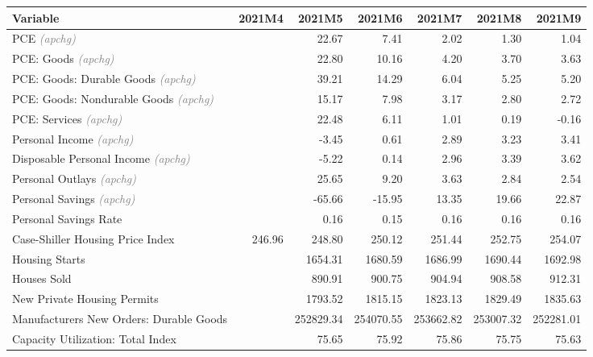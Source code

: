 \documentclass[11pt, letterpaper]{article}\usepackage[]{graphicx}\usepackage[]{color}
\begin{document}
\begin{table}[H]
\centering
\begingroup\fontsize{10pt}{12pt}\selectfont
\begin{tabular}{lrrrrrr}
  \hline
Variable & 2021M4 & 2021M5 & 2021M6 & 2021M7 & 2021M8 & 2021M9 \\ 
  \hline
PCE \textit{\footnotesize\textcolor{gray}{(apchg)}} &  & 22.67 & 7.41 & 2.02 & 1.30 & 1.04 \\ 
  PCE: Goods \textit{\footnotesize\textcolor{gray}{(apchg)}} &  & 22.80 & 10.16 & 4.20 & 3.70 & 3.63 \\ 
  PCE: Goods: Durable Goods \textit{\footnotesize\textcolor{gray}{(apchg)}} &  & 39.21 & 14.29 & 6.04 & 5.25 & 5.20 \\ 
  PCE: Goods: Nondurable Goods \textit{\footnotesize\textcolor{gray}{(apchg)}} &  & 15.17 & 7.98 & 3.17 & 2.80 & 2.72 \\ 
  PCE: Services \textit{\footnotesize\textcolor{gray}{(apchg)}} &  & 22.48 & 6.11 & 1.01 & 0.19 & -0.16 \\ 
  Personal Income \textit{\footnotesize\textcolor{gray}{(apchg)}} &  & -3.45 & 0.61 & 2.89 & 3.23 & 3.41 \\ 
  Disposable Personal Income \textit{\footnotesize\textcolor{gray}{(apchg)}} &  & -5.22 & 0.14 & 2.96 & 3.39 & 3.62 \\ 
  Personal Outlays \textit{\footnotesize\textcolor{gray}{(apchg)}} &  & 25.65 & 9.20 & 3.63 & 2.84 & 2.54 \\ 
  Personal Savings \textit{\footnotesize\textcolor{gray}{(apchg)}} &  & -65.66 & -15.95 & 13.35 & 19.66 & 22.87 \\ 
  Personal Savings Rate &  & 0.16 & 0.15 & 0.16 & 0.16 & 0.16 \\ 
  Case-Shiller Housing Price Index & 246.96 & 248.80 & 250.12 & 251.44 & 252.75 & 254.07 \\ 
  Housing Starts &  & 1654.31 & 1680.59 & 1686.99 & 1690.44 & 1692.98 \\ 
  Houses Sold &  & 890.91 & 900.75 & 904.94 & 908.58 & 912.31 \\ 
  New Private Housing Permits &  & 1793.52 & 1815.15 & 1823.13 & 1829.49 & 1835.63 \\ 
  Manufacturers New Orders: Durable Goods &  & 252829.34 & 254070.55 & 253662.82 & 253007.32 & 252281.01 \\ 
  Capacity Utilization: Total Index &  & 75.65 & 75.92 & 75.86 & 75.75 & 75.63 \\ 

\end{tabular}
\end{table}
\end{document}
